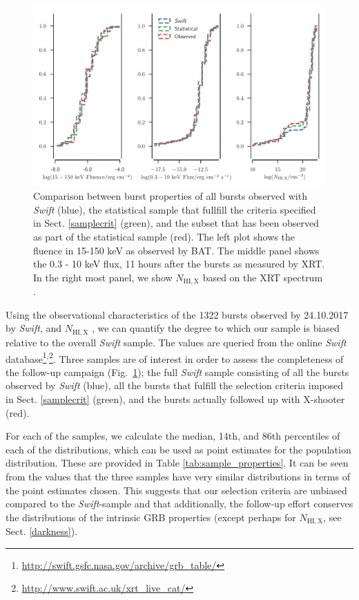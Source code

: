 \documentclass{aa}    %
\begin{document}
\begin{figure}
	\centerline{\includegraphics[width=18cm]{figures/completeness_BAT.pdf}}
\caption{Comparison between burst properties of all bursts observed with
	\textit{Swift} (blue), the statistical sample that fullfill the criteria
	specified in Sect. \ref{samplecrit} (green), and the subset that has been
	observed as part of the statistical sample (red). The left plot shows the
	fluence in 15-150 keV as observed by BAT. The middle panel shows the 0.3 - 10
	keV flux, 11 hours after the bursts as measured by XRT. In the right most
	panel, we show $N_{\mathrm{HI,X}}$ based on the XRT spectrum
	\citep{Evans2009}.} \label{fig:swift_complete}
\end{figure}

Using the observational characteristics of the 1322 bursts observed by
24.10.2017 by \textit{Swift}, and $N_{\mathrm{HI,X}}$ \citep{Evans2009}, we can
quantify the degree to which our sample is biased relative to the overall
\textit{Swift} sample. The values are queried from the online \textit{Swift}
database\footnote{\url{http://swift.gsfc.nasa.gov/archive/grb\_table/}}$^,$\footnote{\url{http://www.swift.ac.uk/xrt\_live\_cat/}}. Three samples are of interest in order to assess the completeness of the follow-up campaign (Fig.~\ref{fig:swift_complete}); the full \textit{Swift} sample consisting of all the bursts observed by \textit{Swift} (blue), all the bursts that fulfill the selection criteria imposed in Sect. \ref{samplecrit} (green), and the bursts actually followed up with X-shooter (red).



For each of the samples, we calculate the median, 14th, and 86th percentiles of
each of the distributions, which can be used as point estimates for the
population distribution. These are provided in Table
\ref{tab:sample_properties}. It can be seen from the values that the three
samples have very similar distributions in terms of the point estimates chosen.
This suggests that our selection criteria are unbiased compared to the
\textit{Swift}-sample and that additionally, the follow-up effort conserves the
distributions of the intrinsic GRB properties (except perhaps for
$N_{\mathrm{HI,X}}$, see Sect. \ref{darkness}).
\end{document}
